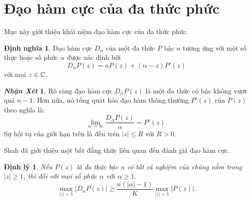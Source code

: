 \documentclass[a5paper,12pt]{report}
\theoremstyle{definition}
\newtheorem{dinhngia}{Định nghĩa}[section]
\newtheorem{dinhly}{Định lý}[section]
\newtheorem{nhanxet}{{\it\bfseries Nhận Xét}}[section]
\newcommand{\dn}{\begin{dinhngia}}
\newcommand{\hdn}{\end{dinhngia}}
\newcommand{\dl}{\begin{dinhly}\itshape}
\newcommand{\hdl}{\end{dinhly}}
\newcommand{\nx}{\begin{nhanxet}}
\newcommand{\hnx}{\end{nhanxet}}
\def\leq{\leqslant}
\numberwithin{equation}{chapter}
\def\vt{\vert}
\def\vt{\vert}
\def\vt{\vert}
\begin{document}
	\section{Đạo hàm cực của đa thức phức}
	Mục này giới thiệu khái niệm đạo hàm cực của đa thức phức.
	\dn Đạo hàm cực $D_\alpha$ của một đa thức $P$ bậc $n$  tương ứng với một số thực hoặc số phức $\alpha$ được xác định bởi
	\begin{equation}\label{daohamcuc}
		D_\alpha P(z)= nP(z)+(\alpha -z)P'(z)
	\end{equation}
	với mọi $z\in \Bbb C$.
	\hdn
	\nx  Rõ ràng đạo hàm cực $D_\alpha P(z)$ là một đa thức có bậc không vượt quá  $n-1$.  Hơn nữa, nó tổng quát hóa đạo hàm thông thường $P'(z)$ của $P(z)$ theo nghĩa là:
	\[\lim_{\alpha\to\infty}\frac{D_\alpha P(z)}{\alpha }=P'(z).\]
	Sự hội tụ của giới hạn trên là đều trên $\vt z\vt \leq R$ với $R>0$.
	\hnx
	Shah  đã giới thiệu một bất đẳng thức  liên quan  đến đánh giá đạo hàm cực.
	\dl  Nếu $P(z)$ là đa thức bậc $n$ có tất cả nghiệm của chúng nằm trong $|z|\ge 1$, thì đối với mọi số phức $\alpha$ với $\alpha \ge 1$.
	\begin{equation}\label{(13)}
		\max\limits_{\vt z\vt=1}|D_\alpha P(z)| \ge \frac{n(|\alpha|-1)}{K}\max\limits_{\vt z\vt=1}|P(z)|.
	\end{equation}
	\hdl
	
\end{document}
